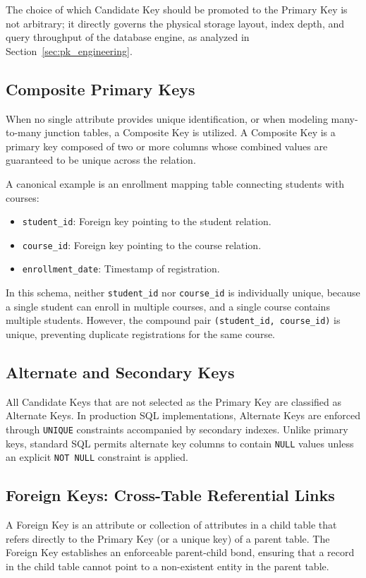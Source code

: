 \documentclass[10pt,journal,compsoc,onecolumn]{IEEEtran}
\begin{document}
The choice of which Candidate Key should be promoted to the Primary Key is not arbitrary; it directly governs the physical storage layout, index depth, and query throughput of the database engine, as analyzed in Section~\ref{sec:pk_engineering}.

\subsection{Composite Primary Keys}
When no single attribute provides unique identification, or when modeling many-to-many junction tables, a Composite Key is utilized. A Composite Key is a primary key composed of two or more columns whose combined values are guaranteed to be unique across the relation.

A canonical example is an enrollment mapping table connecting students with courses:
\begin{itemize}
    \item \texttt{student\_id}: Foreign key pointing to the student relation.
    \item \texttt{course\_id}: Foreign key pointing to the course relation.
    \item \texttt{enrollment\_date}: Timestamp of registration.
\end{itemize}
In this schema, neither \texttt{student\_id} nor \texttt{course\_id} is individually unique, because a single student can enroll in multiple courses, and a single course contains multiple students. However, the compound pair \texttt{(student\_id, course\_id)} is unique, preventing duplicate registrations for the same course.

\subsection{Alternate and Secondary Keys}
All Candidate Keys that are not selected as the Primary Key are classified as Alternate Keys. In production SQL implementations, Alternate Keys are enforced through \texttt{UNIQUE} constraints accompanied by secondary indexes. Unlike primary keys, standard SQL permits alternate key columns to contain \texttt{NULL} values unless an explicit \texttt{NOT NULL} constraint is applied.

\subsection{Foreign Keys: Cross-Table Referential Links}
A Foreign Key is an attribute or collection of attributes in a child table that refers directly to the Primary Key (or a unique key) of a parent table. The Foreign Key establishes an enforceable parent-child bond, ensuring that a record in the child table cannot point to a non-existent entity in the parent table.
\end{document}
